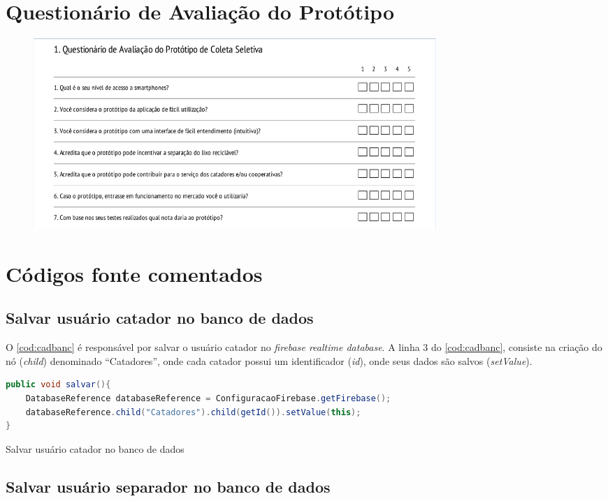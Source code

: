 
\chapter{Questionário de Avaliação do Protótipo}

\begin{figure}[H]
	\begin{Center}
		\includegraphics[width=6.00in]{media/questionariopaint.png}
		\label{fig:questionario}
	\end{Center}
\end{figure}

\chapter{Códigos fonte comentados}

\section{Salvar usuário catador no banco de dados}

O \autoref{cod:cadbanc} é responsável por salvar o usuário catador no \textit{firebase realtime database}. A linha 3 do \autoref{cod:cadbanc}, consiste na criação do nó (\textit{child}) denominado “Catadores”, onde cada catador possui um identificador (\textit{id}), onde seus dados são salvos (\textit{setValue}).

\begin{codigo}[H]
\begin{lstlisting}[language=Java]
public void salvar(){
    DatabaseReference databaseReference = ConfiguracaoFirebase.getFirebase();
    databaseReference.child("Catadores").child(getId()).setValue(this);
}
\end{lstlisting}
\caption{Salvar usuário catador no banco de dados}
\label{cod:cadbanc}
\end{codigo}


\section{Salvar usuário separador no banco de dados}

